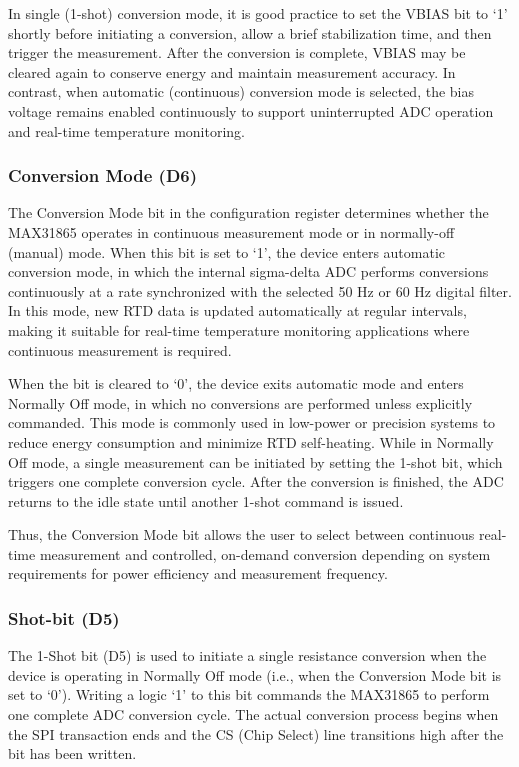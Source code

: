 In single (1-shot) conversion mode, it is good practice to set the VBIAS bit to ‘1’ shortly before initiating a conversion, allow a brief stabilization time, and then trigger the measurement. After the conversion is complete, VBIAS may be cleared again to conserve energy and maintain measurement accuracy. In contrast, when automatic (continuous) conversion mode is selected, the bias voltage remains enabled continuously to support uninterrupted ADC operation and real-time temperature monitoring.

\subsubsection{Conversion Mode (D6)}
The Conversion Mode bit in the configuration register determines whether the MAX31865 operates in continuous measurement mode or in normally-off (manual) mode. When this bit is set to ‘1’, the device enters automatic conversion mode, in which the internal sigma-delta ADC performs conversions continuously at a rate synchronized with the selected 50 Hz or 60 Hz digital filter. In this mode, new RTD data is updated automatically at regular intervals, making it suitable for real-time temperature monitoring applications where continuous measurement is required.

When the bit is cleared to ‘0’, the device exits automatic mode and enters Normally Off mode, in which no conversions are performed unless explicitly commanded. This mode is commonly used in low-power or precision systems to reduce energy consumption and minimize RTD self-heating. While in Normally Off mode, a single measurement can be initiated by setting the 1-shot bit, which triggers one complete conversion cycle. After the conversion is finished, the ADC returns to the idle state until another 1-shot command is issued.

Thus, the Conversion Mode bit allows the user to select between continuous real-time measurement and controlled, on-demand conversion depending on system requirements for power efficiency and measurement frequency.

\subsubsection{Shot-bit (D5)}
The 1-Shot bit (D5) is used to initiate a single resistance conversion when the device is operating in Normally Off mode (i.e., when the Conversion Mode bit is set to ‘0’). Writing a logic ‘1’ to this bit commands the MAX31865 to perform one complete ADC conversion cycle. The actual conversion process begins when the SPI transaction ends and the CS (Chip Select) line transitions high after the bit has been written.

